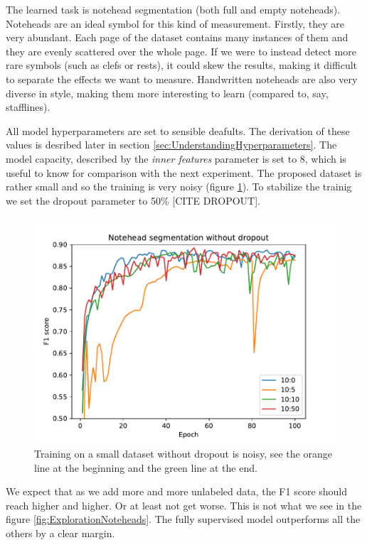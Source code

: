 The learned task is notehead segmentation (both full and empty noteheads). Noteheads are an ideal symbol for this kind of measurement. Firstly, they are very abundant. Each page of the dataset contains many instances of them and they are evenly scattered over the whole page. If we were to instead detect more rare symbols (such as clefs or rests), it could skew the results, making it difficult to separate the effects we want to measure. Handwritten noteheads are also very diverse in style, making them more interesting to learn (compared to, say, stafflines).

All model hyperparameters are set to sensible deafults. The derivation of these values is desribed later in section \ref{sec:UnderstandingHyperparameters}. The model capacity, described by the \emph{inner features} parameter is set to 8, which is useful to know for comparison with the next experiment. The proposed dataset is rather small and so the training is very noisy (figure \ref{fig:ExplorationNoteheadsNoDropout}). To stabilize the trainig we set the dropout parameter to 50\% [CITE DROPOUT].

\begin{figure}[ht]
    \centering
    \includegraphics[width=140mm]{../../figures/01-exploration-noteheads/noteheads.pdf}
    \caption{Training on a small dataset without dropout is noisy, see the orange line at the beginning and the green line at the end.}
    \label{fig:ExplorationNoteheadsNoDropout}
\end{figure}

We expect that as we add more and more unlabeled data, the F1 score should reach higher and higher. Or at least not get worse. This is not what we see in the figure \ref{fig:ExplorationNoteheads}. The fully supervised model outperforms all the others by a clear margin.

